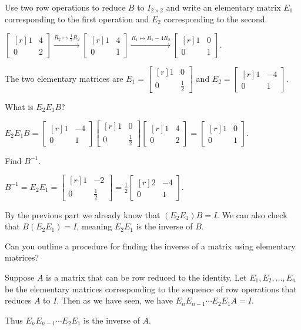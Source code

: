 \documentclass{problemset}
\newcommand{\mat}[1]{\begin{bmatrix*}[r]#1\end{bmatrix*}}
\begin{document}
	\begin{parts}
		\item Use two row operations to reduce $B$ to $I_{2\times 2}$ and write
			an elementary matrix $E_1$ corresponding to the first operation and
			$E_2$ corresponding to the second.
			\begin{solution}
				$\mat{1&4\\0&2}\xrightarrow{R_2\mapsto \frac{1}{2}R_2}\mat{1&4\\0&1}
				\xrightarrow{R_1\mapsto R_1-4R_2}\mat{1&0\\0&1}$.

				The two elementary matrices are $E_1=\mat{1&0\\0&\frac{1}{2}}$
				and $E_2=\mat{1&-4\\0&1}$.
			\end{solution}
		\item What is $E_2E_1B$?
			\begin{solution}
				$E_2E_1B=\mat{1&-4\\0&1}\mat{1&0\\0&\frac{1}{2}}\mat{1 &4\\0 &2}=\mat{1&0\\0&1}$.
			\end{solution}
		\item Find $B^{-1}$.
			\begin{solution}
				$B^{-1}=E_2E_1=\mat{1&-2\\0&\frac{1}{2}}=\frac{1}{2}\mat{2&-4\\0&1}$.

				By the previous part we already know that $(E_2E_1)B=I$. We can also
				check that $B(E_2E_1)=I$, meaning $E_2E_1$ is the inverse of $B$.
			\end{solution}
		\item Can you outline a procedure for finding the inverse of a matrix
		using elementary matrices?
			\begin{solution}
				Suppose $A$ is a matrix that can be row reduced to the identity.
				Let $E_1, E_2, \dots, E_n$ be the elementary matrices corresponding
				to the sequence of row operations that reduces $A$ to $I$. Then
				as we have seen, we have $E_n E_{n-1} \cdots E_2 E_1 A = I$.

				Thus $E_n E_{n-1} \cdots E_2 E_1$ is the inverse of $A$.
			\end{solution}
	\end{parts}
\end{document}
